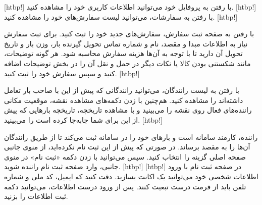 	[htbp!]
\newpage
		 با رفتن به پروفایل خود می‌توانید اطلاعات کاربری خود را مشاهده کنید.
	[htbp!]
	 با رفتن به سفارشات، می‌توانید لیست سفارش‌های خود را مشاهده کنید.
[htbp!]

	 با رفتن به صفحه ثبت سفارش، سفارش‌های جدید خود را ثبت کنید. برای ثبت سفارش نیاز به اطلاعات مبدا و مقصد، نام و شماره تماس تحویل گیرنده بار، وزن بار و تاریخ تحویل آن دارید تا با توجه به آن‌ها هزینه سفارش محاسبه شود. هر گونه توضیحات، مانند شکستنی بودن کالا یا نکات دیگر در حمل و نقل آن را در بخش توضیحات اضافه کنید و سپس سفارش خود را ثبت کنید.
[htbp!]


	 با رفتن به لیست رانندگان، می‌توانید رانندگانی که پیش از این با صاحب بار تعامل داشته‌اند را مشاهده کنید. هم‌چنین با زدن دکمه‌های مشاهده نقشه، موقعیت مکانی راننده‌های فعال روی نقشه را می‌بینید و با مشاهده تاریخچه، تاریخچه بارهایی که پیش از این برای شما جابه‌جا کرده است را می‌بینید.
[htbp!]
\newpage
	 
	
		 راننده، کارمند سامانه است و بارهای خود را در سامانه ثبت می‌کند تا از طریق رانندگان آن‌ها را به مقصد برساند. در صورتی که پیش از این ثبت نام نکرده‌اید، از منوی جانبی صفحه اصلی گزینه  را انتخاب کنید. سپس می‌توانید با زدن دکمه «ثبت نام» در منوی جانبی، وارد صفحه ثبت نام راننده شوید.
	[htbp!]
[htbp!]
	در صفحه ثبت نام با ورود اطلاعات شخصی خود می‌توانید یک اکانت بسازید. دقت کنید که ایمیل، کد ملی و شماره تلفن باید از فرمت درست تبعیت کنند. پس از ورود درست اطلاعات، می‌توانید دکمه ثبت اطلاعات را بزنید.

